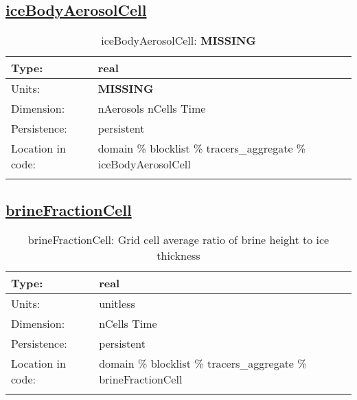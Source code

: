 \subsection[iceBodyAerosolCell]{\hyperref[sec:var_tab_tracers_aggregate]{iceBodyAerosolCell}}
\label{subsec:var_sec_tracers_aggregate_iceBodyAerosolCell}
\begin{center}
\begin{longtable}{| p{2.0in} | p{4.0in} |}
        \hline 
        Type: & real \\
        \hline 
        Units: & {\bf \color{red} MISSING} \\
        \hline 
        Dimension: & nAerosols nCells Time \\
        \hline 
        Persistence: & persistent \\
        \hline 
         Location in code: & domain \% blocklist \% tracers\_aggregate \% iceBodyAerosolCell \\
         \hline 
    \caption{iceBodyAerosolCell: {\bf \color{red} MISSING}}
\end{longtable}
\end{center}
\subsection[brineFractionCell]{\hyperref[sec:var_tab_tracers_aggregate]{brineFractionCell}}
\label{subsec:var_sec_tracers_aggregate_brineFractionCell}
\begin{center}
\begin{longtable}{| p{2.0in} | p{4.0in} |}
        \hline 
        Type: & real \\
        \hline 
        Units: & \si{unitless} \\
        \hline 
        Dimension: & nCells Time \\
        \hline 
        Persistence: & persistent \\
        \hline 
         Location in code: & domain \% blocklist \% tracers\_aggregate \% brineFractionCell \\
         \hline 
    \caption{brineFractionCell: Grid cell average ratio of brine height to ice thickness}
\end{longtable}
\end{center}
